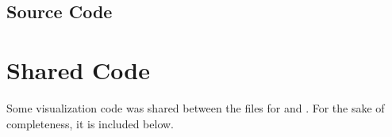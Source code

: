 \documentclass[a4paper,10pt]{article}
\begin{document}
	\subsection{Source Code}
	
	
	
	\section{Shared Code}
	
	Some visualization code was shared between the files for  and .
	For the sake of completeness, it is included below.
	
	
	
\end{document}
